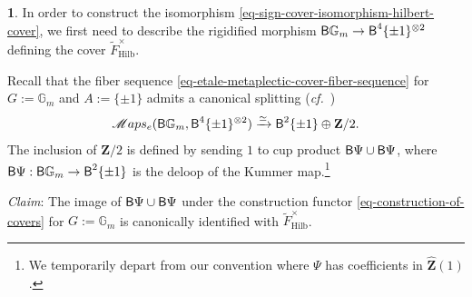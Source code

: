 \documentclass[10pt,english,reqno]{amsart}
\newcommand{\integers}{\mathbf Z}
\newcommand{\SMaps}{\mathscr{M}aps}
\newcommand{\deloop}{\textnormal{\textsf{B}}}
\newcommand{\Hilbert}{\mathrm{Hilb}}
\theoremstyle{definition}
\numberwithin{equation}{section}
\newtheorem{untitledsubsubsection}[subsubsection]{}
\newenvironment{void}
{\begin{untitledsubsubsection}}
{\end{untitledsubsubsection}}
\begin{document}
\begin{void}
\label{void-hilbert-cover}
In order to construct the isomorphism \eqref{eq-sign-cover-isomorphism-hilbert-cover}, we first need to describe the rigidified morphism $\deloop\mathbb G_m \rightarrow \deloop^4\{\pm 1\}^{\otimes 2}$ defining the cover $\widetilde F^{\times}_{\Hilbert}$.

Recall that the fiber sequence \eqref{eq-etale-metaplectic-cover-fiber-sequence} for $G := \mathbb G_m$ and $A := \{\pm 1\}$ admits a canonical splitting (\emph{cf.}~\cite[Remark 4.2.8]{zhao2022metaplectic})
\begin{equation}
\label{eq-multiplicative-cover-splitting}
\SMaps_e(\deloop\mathbb G_m, \deloop^4\{\pm 1\}^{\otimes 2}) \xrightarrow{\simeq} \deloop^2\{\pm 1\} \oplus \integers/2.
\end{equation}
The inclusion of $\integers/2$ is defined by sending $1$ to cup product $\deloop\Psi \cup \deloop\Psi$, where $\deloop\Psi : \deloop\mathbb G_m \rightarrow \deloop^2\{\pm 1\}$ is the deloop of the Kummer map.\footnote{We temporarily depart from our convention where $\Psi$ has coefficients in $\hat{\integers}(1)$.}

\emph{Claim}: The image of $\deloop\Psi \cup \deloop\Psi$ under the construction functor \eqref{eq-construction-of-covers} for $G := \mathbb G_m$ is canonically identified with $\widetilde F^{\times}_{\Hilbert}$.
\end{void}

\end{document}
